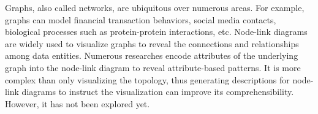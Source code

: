 \maketitle

Graphs, also called networks, are ubiquitous over numerous areas. For example, graphs can model financial transaction behaviors, social media contacts, biological processes such as protein-protein interactions, etc.
Node-link diagrams are widely used to visualize graphs to reveal the connections and relationships among data entities.
Numerous researches encode attributes of the underlying graph into the node-link diagram to reveal attribute-based patterns.
It is more complex than only visualizing the topology, thus generating descriptions for node-link diagrams to instruct the visualization can improve its comprehensibility.
However, it has not been explored yet.

